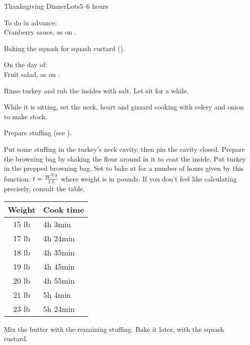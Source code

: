 \documentclass[../Cookbook.tex]{subfiles}
\begin{document}
\begin{recipe}{Thanksgiving Dinner}{Lots}{5--6 hours}

To do in advance: \\
Cranberry sauce, as on .

Baking the squash for squash custard ().

\newstep
On the day of: \\
Fruit salad, as on .

Rinse turkey and rub the insides with salt. Let sit for a while.

While it is sitting, set the neck, heart and gizzard cooking with celery and onion to make stock.

Prepare stuffing (see ).

\begin{minipage}{.7\textwidth}
	Put some stuffing in the turkey's neck cavity, then pin the cavity closed.
	Prepare the browning bag by shaking the flour around in it to coat the inside.
	Put turkey in the prepped browning bag.
	Set to bake at  for a number of hours given by this function:
	$ t = \frac{W^{\nicefrac{2}{3}}}{1.5} $
	where weight is in pounds.
	If you don't feel like calculating precisely, consult the table.
\end{minipage}
\begin{minipage}{.29\textwidth}
	\begin{tabular}{cl}
		Weight & Cook time \\ \hline
		15 lb & 4h 3min \\
		17 lb & 4h 24min \\
		18 lb & 4h 35min \\
		19 lb & 4h 45min \\
		20 lb & 4h 55min \\
		21 lb & 5h 4min \\
		23 lb & 5h 24min
	\end{tabular}
\end{minipage}

Mix the butter with the remaining stuffing. Bake it later, with the squash custard.


\end{recipe}
\end{document}
